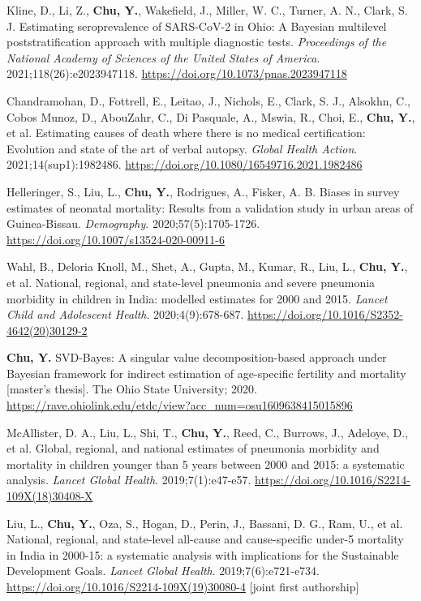 \documentclass[
  11pt,
  letterpaper,
]{article}
\begin{document}
\begin{etaremune}
\item Kline, D., Li, Z., \textbf{Chu, Y.}, Wakefield, J., Miller, W. C., Turner, A. N., Clark, S. J. Estimating seroprevalence of SARS-CoV-2 in Ohio: A Bayesian multilevel poststratification approach with multiple diagnostic tests. \emph{Proceedings of the National Academy of Sciences of the United States of America}. 2021;118(26):e2023947118. \url{https://doi.org/10.1073/pnas.2023947118}
\item Chandramohan, D., Fottrell, E., Leitao, J., Nichols, E., Clark, S. J., Alsokhn, C., Cobos Munoz, D., AbouZahr, C., Di Pasquale, A., Mswia, R., Choi, E., \textbf{Chu, Y.}, et al. Estimating causes of death where there is no medical certification: Evolution and state of the art of verbal autopsy. \emph{Global Health Action}. 2021;14(sup1):1982486. \url{https://doi.org/10.1080/16549716.2021.1982486}
\item Helleringer, S., Liu, L., \textbf{Chu, Y.}, Rodrigues, A., Fisker, A. B. Biases in survey estimates of neonatal mortality: Results from a validation study in urban areas of Guinea-Bissau. \emph{Demography}. 2020;57(5):1705-1726. \url{https://doi.org/10.1007/s13524-020-00911-6}
\item Wahl, B., Deloria Knoll, M., Shet, A., Gupta, M., Kumar, R., Liu, L., \textbf{Chu, Y.}, et al. National, regional, and state-level pneumonia and severe pneumonia morbidity in children in India: modelled estimates for 2000 and 2015. \emph{Lancet Child and Adolescent Health}. 2020;4(9):678-687. \url{https://doi.org/10.1016/S2352-4642(20)30129-2}
\item \textbf{Chu, Y.} SVD-Bayes: A singular value decomposition-based approach under Bayesian framework for indirect estimation of age-specific fertility and mortality [master's thesis]. The Ohio State University; 2020. \url{https://rave.ohiolink.edu/etdc/view?acc_num=osu1609638415015896}
\item McAllister, D. A., Liu, L., Shi, T., \textbf{Chu, Y.}, Reed, C., Burrows, J., Adeloye, D., et al. Global, regional, and national estimates of pneumonia morbidity and mortality in children younger than 5 years between 2000 and 2015: a systematic analysis. \emph{Lancet Global Health}. 2019;7(1):e47-e57. \url{https://doi.org/10.1016/S2214-109X(18)30408-X}
\item Liu, L., \textbf{Chu, Y.}, Oza, S., Hogan, D., Perin, J., Bassani, D. G., Ram, U., et al. National, regional, and state-level all-cause and cause-specific under-5 mortality in India in 2000-15: a systematic analysis with implications for the Sustainable Development Goals. \emph{Lancet Global Health}. 2019;7(6):e721-e734. \url{https://doi.org/10.1016/S2214-109X(19)30080-4} [joint first authorship]

\end{etaremune}
\end{document}

